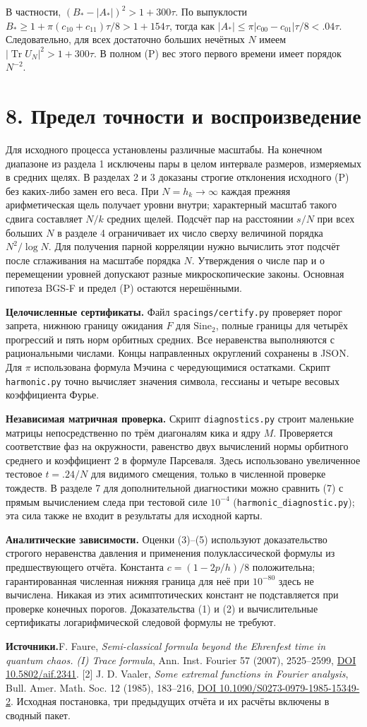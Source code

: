 \documentclass[11pt,a4paper]{article}
\newcommand{\Tr}{\operatorname{Tr}}
\newcommand{\si}{\mathrm{Sine}_2}
\newcommand{\sect}[1]{\section*{\sffamily\color{ink}#1}}
\newcommand{\subt}[1]{\par\medskip\noindent\textbf{#1.}\quad}
\begin{document}
В частности, $(B_*-|A_*|)^2>1+300\tau$. По выпуклости $B_*\ge1+\pi(c_{10}+c_{11})\tau/8>1+154\tau$, тогда как $|A_*|\le\pi|c_{00}-c_{01}|\tau/8<.04\tau$. Следовательно, для всех достаточно больших нечётных $N$ имеем $|\Tr U_N|^2>1+300\tau$. В полном (P) вес этого первого времени имеет порядок $N^{-2}$.
\newpage
\sect{8. Предел точности и воспроизведение}
Для исходного процесса установлены различные масштабы. На конечном диапазоне из раздела 1 исключены пары в целом интервале размеров, измеряемых в средних щелях. В разделах 2 и 3 доказаны строгие отклонения исходного (P) без каких-либо замен его веса. При $N=h_k\to\infty$ каждая прежняя арифметическая щель получает уровни внутри; характерный масштаб такого сдвига составляет $N/k$ средних щелей. Подсчёт пар на расстоянии $s/N$ при всех больших $N$ в разделе 4 ограничивает их число сверху величиной порядка $N^2/\log N$. Для получения парной корреляции нужно вычислить этот подсчёт после сглаживания на масштабе порядка $N$. Утверждения о числе пар и о перемещении уровней допускают разные микроскопические законы. Основная гипотеза BGS-F и предел (P) остаются нерешёнными.

\subt{Целочисленные сертификаты} Файл \texttt{spacings/certify.py} проверяет порог запрета, нижнюю границу ожидания $F$ для $\si$, полные границы для четырёх прогрессий и пять норм орбитных средних. Все неравенства выполняются с рациональными числами. Концы направленных округлений сохранены в JSON. Для $\pi$ использована формула Мэчина с чередующимися остатками. Скрипт \texttt{harmonic.py} точно вычисляет значения символа, гессианы и четыре весовых коэффициента Фурье.

\subt{Независимая матричная проверка} Скрипт \texttt{diagnostics.py} строит маленькие матрицы непосредственно по трём диагоналям кика и ядру $M$. Проверяется соответствие фаз на окружности, равенство двух вычислений нормы орбитного среднего и коэффициент 2 в формуле Парсеваля. Здесь использовано увеличенное тестовое $t=.24/N$ для видимого смещения, только в численной проверке тождеств. В разделе 7 для дополнительной диагностики можно сравнить (7) с прямым вычислением следа при тестовой силе $10^{-4}$ (\texttt{harmonic\_diagnostic.py}); эта сила также не входит в результаты для исходной карты.

\subt{Аналитические зависимости} Оценки (3)--(5) используют доказательство строгого неравенства давления и применения полуклассической формулы из предшествующего отчёта. Константа $c=(1-2p/h)/8$ положительна; гарантированная численная нижняя граница для неё при $10^{-80}$ здесь не вычислена. Никакая из этих асимптотических констант не подставляется при проверке конечных порогов. Доказательства (1) и (2) и вычислительные сертификаты логарифмической следовой формулы не требуют.

\subt{Источники} [1] F. Faure, \emph{Semi-classical formula beyond the Ehrenfest time in quantum chaos. (I) Trace formula}, Ann. Inst. Fourier 57 (2007), 2525--2599, \href{https://doi.org/10.5802/aif.2341}{DOI 10.5802/aif.2341}. [2] J. D. Vaaler, \emph{Some extremal functions in Fourier analysis}, Bull. Amer. Math. Soc. 12 (1985), 183--216, \href{https://doi.org/10.1090/S0273-0979-1985-15349-2}{DOI 10.1090/S0273-0979-1985-15349-2}. Исходная постановка, три предыдущих отчёта и их расчёты включены в сводный пакет.
\end{document}
